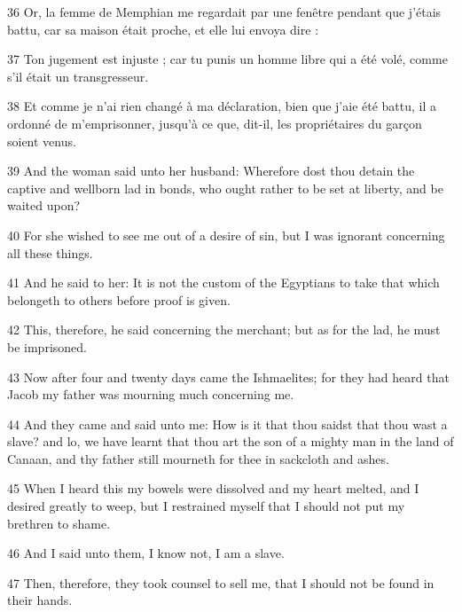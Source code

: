 \par 36 Or, la femme de Memphian me regardait par une fenêtre pendant que j'étais battu, car sa maison était proche, et elle lui envoya dire :

\par 37 Ton jugement est injuste ; car tu punis un homme libre qui a été volé, comme s'il était un transgresseur.

\par 38 Et comme je n'ai rien changé à ma déclaration, bien que j'aie été battu, il a ordonné de m'emprisonner, jusqu'à ce que, dit-il, les propriétaires du garçon soient venus.

\par 39 And the woman said unto her husband: Wherefore dost thou detain the captive and wellborn lad in bonds, who ought rather to be set at liberty, and be waited upon?

\par 40 For she wished to see me out of a desire of sin, but I was ignorant concerning all these things.

\par 41 And he said to her: It is not the custom of the Egyptians to take that which belongeth to others before proof is given.

\par 42 This, therefore, he said concerning the merchant; but as for the lad, he must be imprisoned.

\par 43 Now after four and twenty days came the Ishmaelites; for they had heard that Jacob my father was mourning much concerning me.

\par 44 And they came and said unto me: How is it that thou saidst that thou wast a slave? and lo, we have learnt that thou art the son of a mighty man in the land of Canaan, and thy father still mourneth for thee in sackcloth and ashes.

\par 45 When I heard this my bowels were dissolved and my heart melted, and I desired greatly to weep, but I restrained myself that I should not put my brethren to shame.

\par 46 And I said unto them, I know not, I am a slave.

\par 47 Then, therefore, they took counsel to sell me, that I should not be found in their hands.

